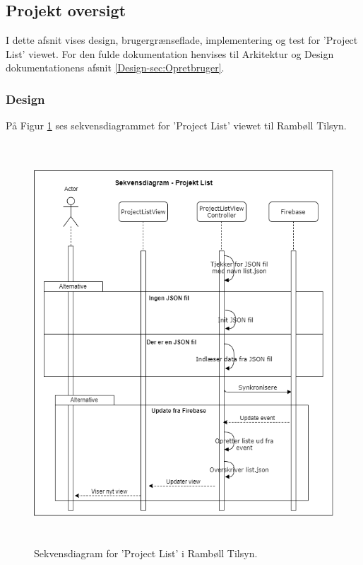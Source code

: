 \subsection{Projekt oversigt}
I dette afsnit vises design, brugergrænseflade, implementering og test for 'Project List' viewet. For den fulde dokumentation henvises til Arkitektur og Design dokumentationens afsnit \ref{Design-sec:Opretbruger}.

\subsubsection{Design}
På Figur \ref{fig:ProjctListSekvens} ses sekvensdiagrammet for 'Project List' viewet til Rambøll Tilsyn.
\begin{figure}[H] %
	\centering
	\includegraphics[height=15cm, width=12cm]{../ArkitekturDesign/Design/ProjectList/ProjektListSekvensDiagram}
	\caption{Sekvensdiagram for 'Project List' i Rambøll Tilsyn.}
	\label{fig:ProjctListSekvens}
\end{figure}

\clearpage

